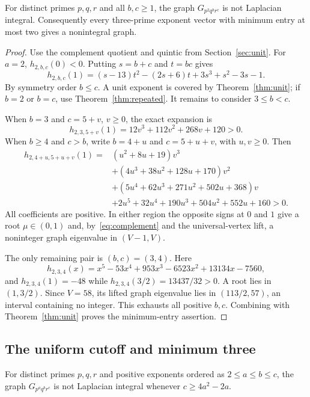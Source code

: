 \begin{theorem}
\label{thm:minimum-two}
For distinct primes $p,q,r$ and all $b,c\geq1$, the graph
$G_{p^2q^br^c}$ is not Laplacian integral. Consequently every
three-prime exponent vector with minimum entry at most two gives a
nonintegral graph.
\end{theorem}

\begin{proof}
Use the complement quotient and quintic from Section~\ref{sec:unit}.
For $a=2$, $h_{2,b,c}(0)<0$. Putting $s=b+c$ and $t=bc$ gives
\[
h_{2,b,c}(1)=(s-13)t^2-(2s+6)t+3s^3+s^2-3s-1.
\]
By symmetry order $b\leq c$. A unit exponent is covered by
Theorem~\ref{thm:unit}; if $b=2$ or $b=c$, use
Theorem~\ref{thm:repeated}. It remains to consider $3\leq b<c$.

When $b=3$ and $c=5+v$, $v\geq0$, the exact expansion is
\[
h_{2,3,5+v}(1)=12v^3+112v^2+268v+120>0.
\]
When $b\geq4$ and $c>b$, write $b=4+u$ and $c=5+u+v$, with
$u,v\geq0$. Then
\begin{align*}
h_{2,4+u,5+u+v}(1)
={}&(u^2+8u+19)v^3\\
&+(4u^3+38u^2+128u+170)v^2\\
&+(5u^4+62u^3+271u^2+502u+368)v\\
&+2u^5+32u^4+190u^3+504u^2+552u+160>0.
\end{align*}
All coefficients are positive. In either region the opposite signs at
$0$ and $1$ give a root $\mu\in(0,1)$ and, by~\eqref{eq:complement}
and the universal-vertex lift, a noninteger graph eigenvalue in $(V-1,V)$.

The only remaining pair is $(b,c)=(3,4)$. Here
\[
h_{2,3,4}(x)=x^5-53x^4+953x^3-6523x^2+13134x-7560,
\]
and $h_{2,3,4}(1)=-48$ while
$h_{2,3,4}(3/2)=13437/32>0$. A root lies in $(1,3/2)$.
Since $V=58$, its lifted graph eigenvalue lies in $(113/2,57)$,
an interval containing no integer. This exhausts all positive $b,c$.
Combining with Theorem~\ref{thm:unit} proves the minimum-entry assertion.
\end{proof}
\subsection{The uniform cutoff and minimum three}\label{sec:distinct-tail}

\begin{proposition}
\label{prop:distinct-tail}
For distinct primes $p,q,r$ and positive exponents ordered as
$2\leq a\leq b\leq c$, the graph $G_{p^a q^b r^c}$ is not
Laplacian integral whenever $c\geq4a^2-2a$.
\end{proposition}

